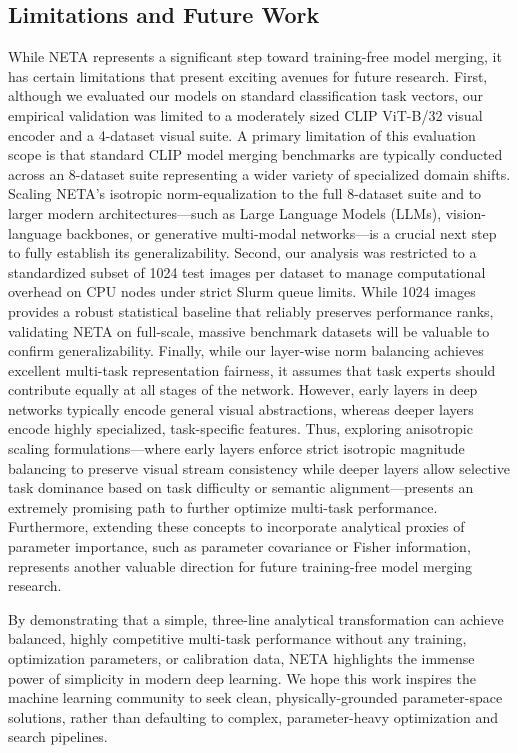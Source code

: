 \subsection{Limitations and Future Work}
While NETA represents a significant step toward training-free model merging, it has certain limitations that present exciting avenues for future research. First, although we evaluated our models on standard classification task vectors, our empirical validation was limited to a moderately sized CLIP ViT-B/32 visual encoder and a 4-dataset visual suite. A primary limitation of this evaluation scope is that standard CLIP model merging benchmarks are typically conducted across an 8-dataset suite representing a wider variety of specialized domain shifts. Scaling NETA's isotropic norm-equalization to the full 8-dataset suite and to larger modern architectures---such as Large Language Models (LLMs), vision-language backbones, or generative multi-modal networks---is a crucial next step to fully establish its generalizability. Second, our analysis was restricted to a standardized subset of 1024 test images per dataset to manage computational overhead on CPU nodes under strict Slurm queue limits. While 1024 images provides a robust statistical baseline that reliably preserves performance ranks, validating NETA on full-scale, massive benchmark datasets will be valuable to confirm generalizability. Finally, while our layer-wise norm balancing achieves excellent multi-task representation fairness, it assumes that task experts should contribute equally at all stages of the network. However, early layers in deep networks typically encode general visual abstractions, whereas deeper layers encode highly specialized, task-specific features. Thus, exploring anisotropic scaling formulations---where early layers enforce strict isotropic magnitude balancing to preserve visual stream consistency while deeper layers allow selective task dominance based on task difficulty or semantic alignment---presents an extremely promising path to further optimize multi-task performance. Furthermore, extending these concepts to incorporate analytical proxies of parameter importance, such as parameter covariance or Fisher information, represents another valuable direction for future training-free model merging research.

By demonstrating that a simple, three-line analytical transformation can achieve balanced, highly competitive multi-task performance without any training, optimization parameters, or calibration data, NETA highlights the immense power of simplicity in modern deep learning. We hope this work inspires the machine learning community to seek clean, physically-grounded parameter-space solutions, rather than defaulting to complex, parameter-heavy optimization and search pipelines.
